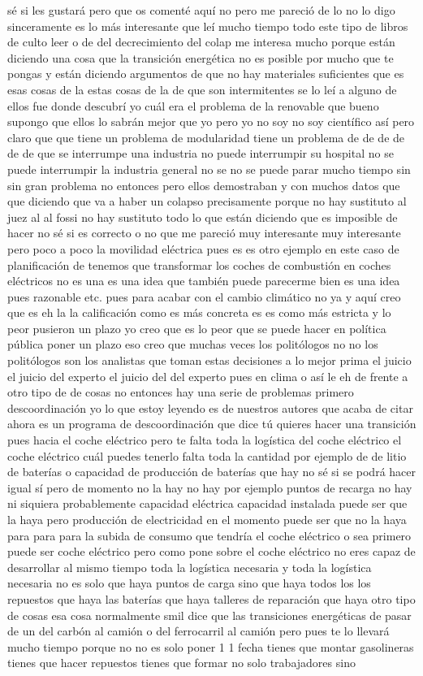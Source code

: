 sé si les gustará pero que os comenté aquí no pero me pareció de lo no lo digo sinceramente es lo más interesante que leí mucho tiempo todo este tipo de libros de culto leer o de del decrecimiento del colap me interesa mucho porque están diciendo una cosa que la transición energética no es posible por mucho que te pongas y están diciendo argumentos de que no hay materiales suficientes que es esas cosas de la estas cosas de la de que son intermitentes se lo leí a alguno de ellos fue donde descubrí yo cuál era el problema de la renovable que bueno supongo que ellos lo sabrán mejor que yo pero yo no soy no soy científico así pero claro que que tiene un problema de modularidad tiene un problema de de de de de de que se interrumpe una industria no puede interrumpir su hospital no se puede interrumpir la industria general no se no se puede parar mucho tiempo sin sin gran problema no entonces pero ellos demostraban y con muchos datos que que diciendo que va a haber un colapso precisamente porque no hay sustituto al juez al al fossi no hay sustituto todo lo que están diciendo que es imposible de hacer no sé si es correcto o no que me pareció muy interesante muy interesante pero poco a poco la movilidad eléctrica pues es es otro ejemplo en este caso de planificación de tenemos que transformar los coches de combustión en coches eléctricos no es una es una idea que también puede parecerme bien es una idea pues razonable etc. pues para acabar con el cambio climático no ya y aquí creo que es eh la la calificación como es más concreta es es como más estricta y lo peor pusieron un plazo yo creo que es lo peor que se puede hacer en política pública poner un plazo eso creo que muchas veces los politólogos no no los politólogos son los analistas que toman estas decisiones a lo mejor prima el juicio el juicio del experto el juicio del del experto pues en clima o así le eh de frente a otro tipo de de cosas no entonces hay una serie de problemas primero descoordinación yo lo que estoy leyendo es de nuestros autores que acaba de citar ahora es un programa de descoordinación que dice tú quieres hacer una transición pues hacia el coche eléctrico pero te falta toda la logística del coche eléctrico el coche eléctrico cuál puedes tenerlo falta toda la cantidad por ejemplo de de litio de baterías o capacidad de producción de baterías que hay no sé si se podrá hacer igual sí pero de momento no la hay no hay por ejemplo puntos de recarga no hay ni siquiera probablemente capacidad eléctrica capacidad instalada puede ser que la haya pero producción de electricidad en el momento puede ser que no la haya para para para la subida de consumo que tendría el coche eléctrico o sea primero puede ser coche eléctrico pero como pone sobre el coche eléctrico no eres capaz de desarrollar al mismo tiempo toda la logística necesaria y toda la logística necesaria no es solo que haya puntos de carga sino que haya todos los los repuestos que haya las baterías que haya talleres de reparación que haya otro tipo de cosas esa cosa normalmente smil dice que las transiciones energéticas de pasar de un del carbón al camión o del ferrocarril al camión pero pues te lo llevará mucho tiempo porque no no es solo poner 1 1 fecha tienes que montar gasolineras tienes que hacer repuestos tienes que formar no solo trabajadores sino 